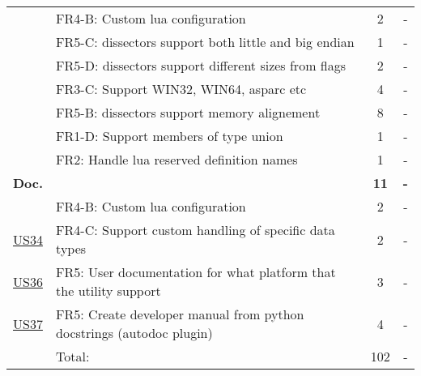 \begin{table}[!htb]
\begin{tabularx}{\textwidth}{l X c c}
	 & FR4-B: Custom \Gls{lua} configuration & 2 & - \\
	 & FR5-C: \Glspl{dissector} support both little and big \gls{endian} & 1 & - \\
	 & FR5-D: \Glspl{dissector} support different sizes from flags & 2 & - \\
	 & FR3-C: Support WIN32, WIN64, \gls{asparc} etc & 4 & - \\
	 & FR5-B: \Glspl{dissector} support memory alignement & 8 & - \\
	 & FR1-D: Support members of type \gls{union} & 1 & - \\
	 & FR2: Handle \Gls{lua} reserved definition names & 1 & - \\
	\addlinespace
	\textbf{Doc.} &  & \textbf{11} & \textbf{-} \\
	 & FR4-B: Custom \Gls{lua} configuration & 2 & - \\
	\hyperref[tab:req:stories8]{US34} & FR4-C: Support custom handling of specific data types & 2 & - \\
	\hyperref[tab:req:stories9]{US36} & FR5: User documentation for what platform that the \gls{utility} support & 3 & - \\
	\hyperref[tab:req:stories9]{US37} & FR5: Create developer manual from python docstrings (autodoc plugin) & 4 & - \\
	\midrule
	& Total: & 102 &  -\\
	\bottomrule
\end{tabularx}
\end{table}


